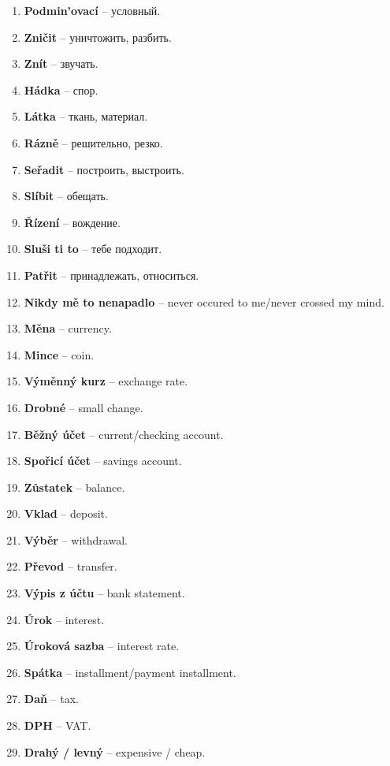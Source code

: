 \documentclass[12pt]{book}
\begin{document}
\begin{enumerate}
    \item \textbf{Podmin'ovací} -- \textrussian{условный}.
    \item \textbf{Zničit} -- \textrussian{уничтожить, разбить}.
    \item \textbf{Znít} -- \textrussian{звучать}.
    \item \textbf{Hádka} -- \textrussian{спор}.
    \item \textbf{Látka} -- \textrussian{ткань, материал}.
    \item \textbf{Rázně} -- \textrussian{решительно, резко}.
    \item \textbf{Seřadit} -- \textrussian{построить, выстроить}.
    \item \textbf{Slíbit} -- \textrussian{обещать}.
    \item \textbf{Řízení} -- \textrussian{вождение}.
    \item \textbf{Sluši ti to} -- \textrussian{тебе подходит}.
    \item \textbf{Patřit} -- \textrussian{принадлежать, относиться}.
    \item \textbf{Nikdy mě to nenapadlo} -- never occured to me/never crossed my mind.
    \item \textbf{Měna} -- currency.
    \item \textbf{Mince} -- coin.
    \item \textbf{Výměnný kurz} -- exchange rate.
    \item \textbf{Drobné} -- small change.
    \item \textbf{Běžný účet} -- current/checking account.
    \item \textbf{Spořicí účet} -- savings account.
    \item \textbf{Zůstatek} -- balance.
    \item \textbf{Vklad} -- deposit.
    \item \textbf{Výběr} -- withdrawal.
    \item \textbf{Převod} -- transfer.
    \item \textbf{Výpis z účtu} -- bank statement.
    \item \textbf{Úrok} -- interest.
    \item \textbf{Úroková sazba} -- interest rate.
    \item \textbf{Spátka} -- installment/payment installment.
    \item \textbf{Daň} -- tax.
    \item \textbf{DPH} -- VAT.
    \item \textbf{Drahý / levný} -- expensive / cheap.

\end{enumerate}
\end{document}
